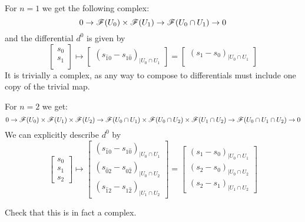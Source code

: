 For $n=1$ we get the following complex:
\begin{equation*}
    0\to \mathscr{F}(U_0)\times \mathscr{F}(U_1)\to \mathscr{F}(U_0\cap U_1)\to 0
\end{equation*}
and the differential $d^0$ is given by 
\begin{equation*}
        \begin{bmatrix}
        s_0 \\
        s_1 \\
    \end{bmatrix}
    \longmapsto
    \begin{bmatrix}
        (s_{\hat{1}0}-s_{1\hat{0}})_{\vert U_0\cap U_1}
    \end{bmatrix}
    =
    \begin{bmatrix}
        (s_1-s_0)_{\vert U_0\cap U_1} \\
    \end{bmatrix}
\end{equation*}
It is trivially a complex, as any way to compose to differentials must include one copy of the trivial map.

For $n=2$ we get: 
\begin{equation*}
    0\to \mathscr{F}(U_0)\times \mathscr{F}(U_1)\times \mathscr{F}(U_2) \to \mathscr{F}(U_0\cap U_1)\times \mathscr{F}(U_0\cap U_2)\times \mathscr{F}(U_1\cap U_2) \to \mathscr{F}(U_0\cap U_1 \cap U_2) \to 0
\end{equation*}
We can explicitly describe $d^0$ by 
\begin{equation*}
    \begin{bmatrix}
        s_0 \\
        s_1 \\
        s_2
    \end{bmatrix}
    \longmapsto
    \begin{bmatrix}
        (s_{\hat{1}0}-s_{1\hat{0}})_{\vert U_0\cap U_1} \\
        (s_{\hat{0}2}-s_{0\hat{2}})_{\vert U_0\cap U_2} \\
        (s_{\hat{1}2}-s_{1\hat{2}})_{\vert U_1\cap U_2}
    \end{bmatrix}
    =
    \begin{bmatrix}
        (s_1-s_0)_{\vert U_0\cap U_1} \\
        (s_2-s_0)_{\vert U_0\cap U_2} \\
        (s_2-s_1)_{\vert U_1\cap U_2}
    \end{bmatrix}
\end{equation*}

\begin{problem}
Check that this is in fact a complex.
\end{problem}

